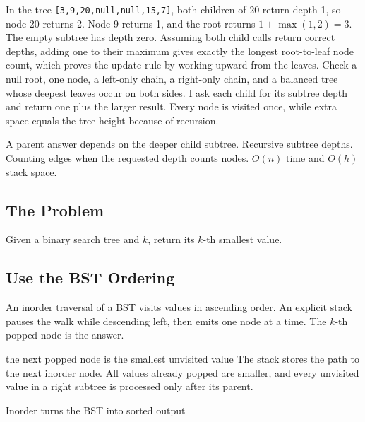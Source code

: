 \lessonexpansion
  {In the tree \texttt{[3,9,20,null,null,15,7]}, both children of 20 return
   depth 1, so node 20 returns 2. Node 9 returns 1, and the root returns
   \(1+\max(1,2)=3\).}
  {The empty subtree has depth zero. Assuming both child calls return correct
   depths, adding one to their maximum gives exactly the longest root-to-leaf
   node count, which proves the update rule by working upward from the leaves.}
  {Check a null root, one node, a left-only chain, a right-only chain, and a
   balanced tree whose deepest leaves occur on both sides.}
  {I ask each child for its subtree depth and return one plus the larger
   result. Every node is visited once, while extra space equals the tree
   height because of recursion.}

\chaptercheckpoint
  {A parent answer depends on the deeper child subtree.}
  {Recursive subtree depths.}
  {Counting edges when the requested depth counts nodes.}
  {$O(n)$ time and $O(h)$ stack space.}



\subsection{The Problem}
Given a binary search tree and \(k\), return its \(k\)-th smallest value.

\subsection{Use the BST Ordering}
An inorder traversal of a BST visits values in ascending order. An explicit
stack pauses the walk while descending left, then emits one node at a time.
The \(k\)-th popped node is the answer.

\begin{invariantbox}{the next popped node is the smallest unvisited value}
The stack stores the path to the next inorder node. All values already popped
are smaller, and every unvisited value in a right subtree is processed only
after its parent.
\end{invariantbox}

\begin{visualbox}{Inorder turns the BST into sorted output}
\centering
{}
\end{visualbox}

